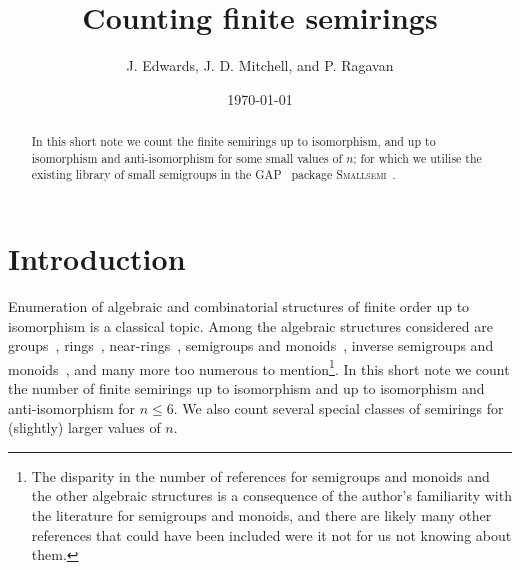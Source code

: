 \documentclass{article}
\title{Counting finite semirings}
\author{J. Edwards, J. D. Mitchell, and P. Ragavan}
\date{\today}
\theoremstyle{definition}
\theoremstyle{plain}
\newcommand{\GAP}{\textsc{GAP}~\cite{GAP4}\xspace}
\newcommand{\Smallsemi}{\textsc{Smallsemi}~\cite{Smallsemi}\xspace}
\begin{document}
\maketitle

\begin{abstract}
  In this short note we count the finite semirings up to isomorphism,
  and up to isomorphism and anti-isomorphism for some small values of
  $n$; for which we utilise the existing library of small semigroups
  in the \GAP package \Smallsemi.
\end{abstract}

\section{Introduction}

Enumeration of algebraic and combinatorial structures of finite order up to
isomorphism is a classical topic. Among the algebraic structures considered are
groups~\cite{BESCHE2002,A000001}, rings~\cite{Blackburn2022, Fine1993,
Kruse1970, A027623}, near-rings~\cite{Chow2024, SONATA, A305858},
semigroups and monoids~\cite{Distler2010, Distler2010, Distler2012, Distler2013,
  Forsythe1955, Grillet1996, Grillet2014, Jrgensen1977, Motzkin1955,
Plemmons1967, A027851, A058129, Satoh1994, A001426, A001423},
inverse semigroups and monoids~\cite{Malandro2019, A001428, A234843,
A234844, A234845}, and many more too numerous to mention\footnote{The disparity
  in the number of references for semigroups and monoids and the other
  algebraic structures is a consequence of the author's familiarity with the
  literature for semigroups and monoids, and there are likely many other
  references that could have been included were it not for us not knowing about
them.}. In this short note we count the number of finite semirings up to
isomorphism and up to isomorphism and anti-isomorphism for $n \leq 6$. We also
count several special classes of semirings for (slightly) larger values of $n$.
\end{document}
